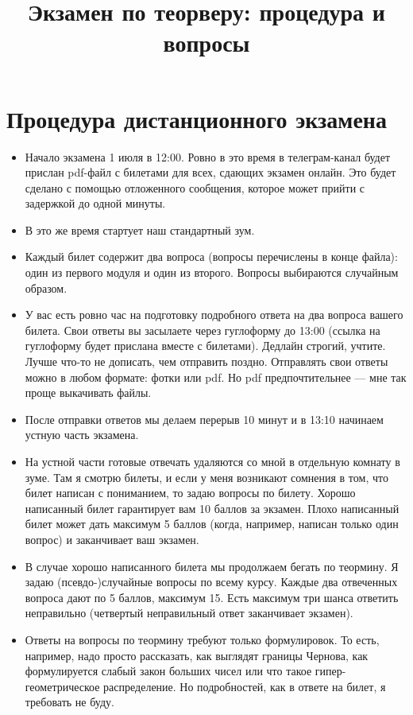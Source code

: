 \documentclass[12pt]{article}
\title{Экзамен по теорверу: процедура и вопросы}
\begin{document}
\maketitle

\section*{Процедура дистанционного экзамена}

\begin{itemize}
  \item Начало экзамена 1 июля в 12:00. Ровно в это время в телеграм-канал будет прислан pdf-файл с билетами для всех, сдающих экзамен онлайн. Это будет сделано с помощью отложенного сообщения, которое может прийти с задержкой до одной минуты.
  \item В это же время стартует наш стандартный зум.
  \item Каждый билет содержит два вопроса (вопросы перечислены в конце файла): один из первого модуля и один из второго. Вопросы выбираются случайным образом.
  \item У вас есть ровно час на подготовку подробного ответа на два вопроса вашего билета. Свои ответы вы засылаете через гуглоформу до 13:00 (ссылка на гуглоформу будет прислана вместе с билетами). Дедлайн строгий, учтите. Лучше что-то не дописать, чем отправить поздно. Отправлять свои ответы можно в любом формате: фотки или pdf. Но pdf предпочтительнее --- мне так проще выкачивать файлы.
  \item После отправки ответов мы делаем перерыв 10 минут и в 13:10 начинаем устную часть экзамена.
  \item На устной части готовые отвечать удаляются со мной в отдельную комнату в зуме. Там я смотрю билеты, и если у меня возникают сомнения в том, что билет написан с пониманием, то задаю вопросы по билету. Хорошо написанный билет гарантирует вам 10 баллов за экзамен. Плохо написанный билет может дать максимум 5 баллов (когда, например, написан только один вопрос) и заканчивает ваш экзамен.
  \item В случае хорошо написанного билета мы продолжаем бегать по теормину. Я задаю (псевдо-)случайные вопросы по всему курсу. Каждые два отвеченных вопроса дают по 5 баллов, максимум 15. Есть максимум три шанса ответить неправильно (четвертый неправильный ответ заканчивает экзамен).
  \item Ответы на вопросы по теормину требуют только формулировок. То есть, например, надо просто рассказать, как выглядят границы Чернова, как формулируется слабый закон больших чисел или что такое гипер-геометрическое распределение. Но подробностей, как в ответе на билет, я требовать не буду.

\end{itemize}
\end{document}
